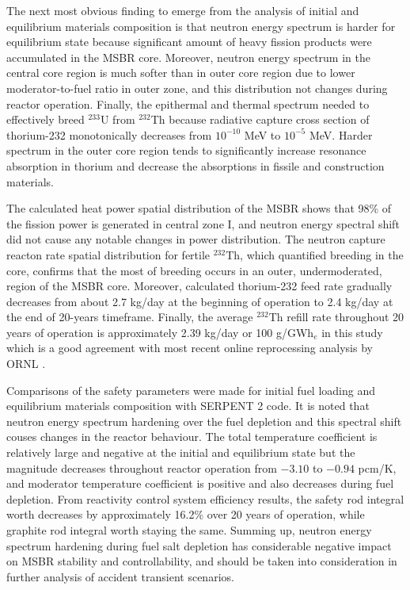 The next most obvious finding to emerge from the analysis of initial and equilibrium materials composition is that neutron energy spectrum is harder for equilibrium state because significant amount of heavy fission products were accumulated in the \gls{MSBR} core. Moreover, neutron energy spectrum in the central core region is much softer than in outer core region due to lower moderator-to-fuel ratio in outer zone, and this distribution not changes during reactor operation. Finally, the epithermal and thermal spectrum needed to effectively breed $^{233}$U from $^{232}$Th because radiative capture cross section of thorium-232 monotonically decreases from $10^{-10}$ MeV to $10^{-5}$ MeV. Harder spectrum in the outer core region tends to significantly increase resonance absorption in thorium and decrease the absorptions in fissile and construction materials. 

The calculated heat power spatial distribution of the \gls{MSBR} shows that 98\% of the fission power is generated in central zone I, and neutron energy spectral shift did not cause any notable changes in power distribution. The neutron capture reacton rate spatial distribution for fertile $^{232}$Th, which quantified breeding in the core, confirms that the most of breeding occurs in an outer, undermoderated, region of the \gls{MSBR} core. Moreover, calculated thorium-232 feed rate gradually decreases from about 2.7 kg/day at the beginning of operation to 2.4 kg/day at the end of 20-years timeframe. Finally, the average $^{232}$Th refill rate throughout 20 years of operation is approximately 2.39 kg/day or 100 g/GWh$_e$ in this study which is a good agreement with most recent online reprocessing analysis by \gls{ORNL} \cite{betzler_molten_2017}.

Comparisons of the safety parameters were made for initial fuel loading and equilibrium materials composition with SERPENT 2 code. It is noted that neutron energy spectrum hardening over the fuel depletion and this spectral shift couses changes in the reactor behaviour. The total temperature coefficient is relatively large and negative at the initial and equilibrium state but the magnitude decreases throughout reactor operation from $-3.10$ to $-0.94$ pcm/K, and moderator temperature coefficient is positive and also decreases during fuel depletion. From reactivity control system efficiency results, the safety rod integral worth decreases by approximately 16.2\% over 20 years of operation, while graphite rod integral worth staying the same. Summing up, neutron energy spectrum hardening during fuel salt depletion has considerable negative impact on \gls{MSBR} stability and controllability, and should be taken into consideration in further analysis of accident transient scenarios.

